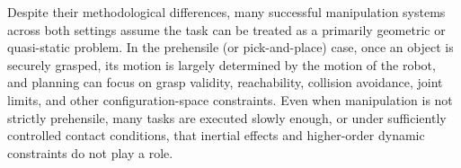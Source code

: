 
Despite their methodological differences, many successful manipulation systems across both settings assume the task can be treated as a primarily geometric or quasi-static problem.
In the prehensile (or pick-and-place) case, once an object is securely grasped, its motion is largely determined by the motion of the robot, and planning can focus on grasp validity, reachability, collision avoidance, joint limits, and other configuration-space constraints.
Even when manipulation is not strictly prehensile, many tasks are executed slowly enough, or under sufficiently controlled contact conditions, that inertial effects and higher-order dynamic constraints do not play a role.

